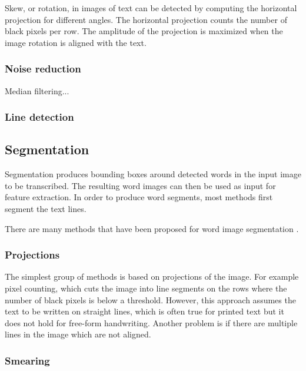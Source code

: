 Skew, or rotation, in images of text can be detected by computing the horizontal projection for different angles. The horizontal projection counts the number of black pixels per row. The amplitude of the projection is maximized when the image rotation is aligned with the text.

\subsubsection{Noise reduction}


Median filtering...

\subsubsection{Line detection}


\subsection{Segmentation}

Segmentation produces bounding boxes around detected words in the input image to be transcribed. The resulting word images can then be used as input for feature extraction. In order to produce word segments, most methods first segment the text lines.

There are many methods that have been proposed for word image segmentation \cite{HWR_survey, Waterflow2011, Waterflow2015}.

\subsubsection{Projections}

The simplest group of methods is based on projections of the image. For example pixel counting, which cuts the image into line segments on the rows where the number of black pixels is below a threshold. However, this approach assumes the text to be written on straight lines, which is often true for printed text but it does not hold for free-form handwriting. Another problem is if there are multiple lines in the image which are not aligned.

\subsubsection{Smearing}


